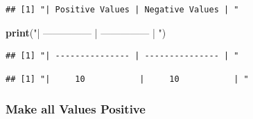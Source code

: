 \documentclass[]{article}
\newenvironment{Shaded}{}{}
\newcommand{\CommentTok}[1]{\textcolor[rgb]{0.38,0.63,0.69}{\textit{#1}}}
\newcommand{\DecValTok}[1]{\textcolor[rgb]{0.25,0.63,0.44}{#1}}
\newcommand{\KeywordTok}[1]{\textcolor[rgb]{0.00,0.44,0.13}{\textbf{#1}}}
\newcommand{\NormalTok}[1]{#1}
\newcommand{\OperatorTok}[1]{\textcolor[rgb]{0.40,0.40,0.40}{#1}}
\newcommand{\StringTok}[1]{\textcolor[rgb]{0.25,0.44,0.63}{#1}}
\begin{document}
\begin{Shaded}
\end{Shaded}

\begin{verbatim}
## [1] "| Positive Values | Negative Values | "
\end{verbatim}

\begin{Shaded}
\begin{Highlighting}[]
\KeywordTok{print}\NormalTok{(}\StringTok{"| --------------- | --------------- | "}\NormalTok{)}
\end{Highlighting}
\end{Shaded}

\begin{verbatim}
## [1] "| --------------- | --------------- | "
\end{verbatim}

\begin{Shaded}
\end{Shaded}

\begin{verbatim}
## [1] "|     10           |     10           | "
\end{verbatim}

\hypertarget{make-all-values-positive}{%
\subsubsection{Make all Values
Positive}\label{make-all-values-positive}}
\end{document}
